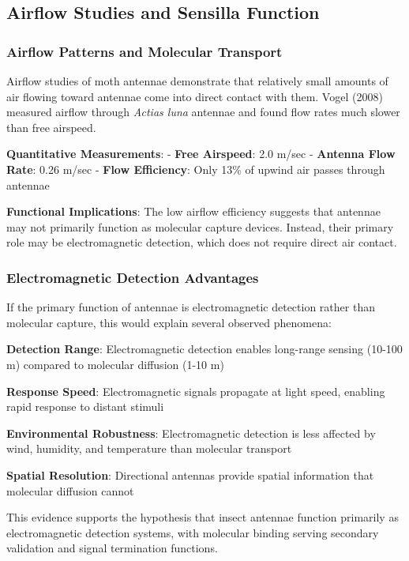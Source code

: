 \documentclass[
  13pt,
  a4paperpaper,
  12pt]{article}
\begin{document}
\subsection{Airflow Studies and Sensilla
Function}\label{airflow-studies-and-sensilla-function}

\subsubsection{Airflow Patterns and Molecular
Transport}\label{airflow-patterns-and-molecular-transport}

Airflow studies of moth antennae demonstrate that relatively small
amounts of air flowing toward antennae come into direct contact with
them. Vogel (2008) measured airflow through \emph{Actias luna} antennae
and found flow rates much slower than free airspeed.

\textbf{Quantitative Measurements}: - \textbf{Free Airspeed}: 2.0 m/sec
- \textbf{Antenna Flow Rate}: 0.26 m/sec - \textbf{Flow Efficiency}:
Only 13\% of upwind air passes through antennae

\textbf{Functional Implications}: The low airflow efficiency suggests
that antennae may not primarily function as molecular capture devices.
Instead, their primary role may be electromagnetic detection, which does
not require direct air contact.

\subsubsection{Electromagnetic Detection
Advantages}\label{electromagnetic-detection-advantages}

If the primary function of antennae is electromagnetic detection rather
than molecular capture, this would explain several observed phenomena:

\textbf{Detection Range}: Electromagnetic detection enables long-range
sensing (10-100 m) compared to molecular diffusion (1-10 m)

\textbf{Response Speed}: Electromagnetic signals propagate at light
speed, enabling rapid response to distant stimuli

\textbf{Environmental Robustness}: Electromagnetic detection is less
affected by wind, humidity, and temperature than molecular transport

\textbf{Spatial Resolution}: Directional antennas provide spatial
information that molecular diffusion cannot

This evidence supports the hypothesis that insect antennae function
primarily as electromagnetic detection systems, with molecular binding
serving secondary validation and signal termination functions.
\end{document}
